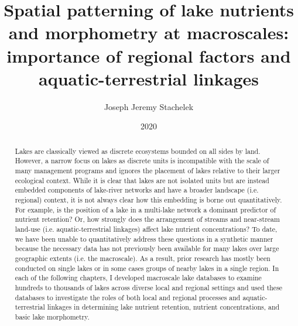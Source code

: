 \documentclass[]{msu-thesis}
\title{Spatial patterning of lake nutrients and morphometry at macroscales: importance of regional factors and aquatic-terrestrial linkages}
\author{Joseph Jeremy Stachelek}
\date{2020}
\theoremstyle{definition}
\theoremstyle{definition}
\theoremstyle{definition}
\theoremstyle{remark}
\begin{document}

\maketitlepage
\begin{abstract}
Lakes are classically viewed as discrete ecosystems bounded on all sides by land. However, a narrow focus on lakes as discrete units is incompatible with the scale of many management programs and ignores the placement of lakes relative to their larger ecological context. While it is clear that lakes are not isolated units but are instead embedded components of lake-river networks and have a broader landscape (i.e. regional) context, it is not always clear how this embedding is borne out quantitatively. For example, is the position of a lake in a multi-lake network a dominant predictor of nutrient retention? Or, how strongly does the arrangement of streams and near-stream land-use (i.e. aquatic-terrestrial linkages) affect lake nutrient concentrations? To date, we have been unable to quantitatively address these questions in a synthetic manner because the necessary data has not previously been available for many lakes over large geographic extents (i.e. the macroscale). As a result, prior research has mostly been conducted on single lakes or in some cases groups of nearby lakes in a single region. In each of the following chapters, I developed macroscale lake databases to examine hundreds to thousands of lakes across diverse local and regional settings and used these databases to investigate the roles of both local and regional processes and aquatic-terrestrial linkages in determining lake nutrient retention, nutrient concentrations, and basic lake morphometry.


\end{abstract}
\end{document}
